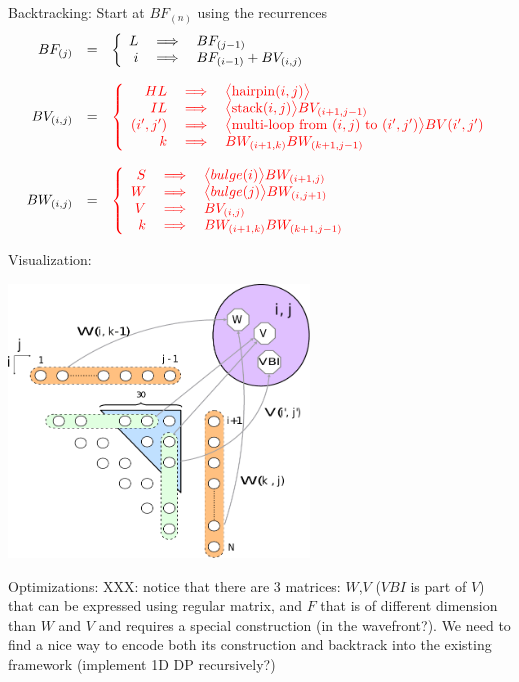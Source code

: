 \item Backtracking: Start at $BF_{(n)}$ using the recurrences
 \[\begin{array}{rcl}
	BF_{(j)} &=& \left\{\begin{array}{rcl} L&\implies& BF_{(j-1)} \\ i &\implies& BF_{(i-1)} + BV_{(i,j)} \end{array} \right.\\
	\\
	BV_{(i,j)} &=& \color{red} \left\{\begin{array}{rcl}
		HL &\implies&\big< {\rm hairpin}(i,j) \big> \\
		IL &\implies& \big< {\rm stack}(i,j) \big> BV_{(i+1,j-1)} \\
		(i',j') &\implies& \big< \text{multi-loop from $(i,j)$ to }(i',j') \big> BV(i',j')\\
		k &\implies& BW_{(i+1,k)} BW_{(k+1,j-1)}
	\end{array}\right.\\
	\\
	BW_{(i,j)} &=& \color{red} \left\{\begin{array}{rcl}
	S & \implies & \big< bulge(i) \big> BW_{(i+1,j)} \\
	W & \implies & \big< bulge(j) \big> BW_{(i,j+1)} \\
	V &\implies& BV_{(i,j)} \\
	k &\implies& BW_{(i+1,k)} BW_{(k+1,j-1)}
	\end{array}\right.
\end{array}\]

\item Visualization: \begin{center}\includegraphics[width=8cm]{inc/zucker.pdf}\end{center}
\item Optimizations: {\color{red} XXX: notice that there are 3 matrices: $W$,$V$ ($VBI$ is part of $V$) that can be expressed using regular matrix, and $F$ that is of different dimension than $W$ and $V$ and requires a special construction (in the wavefront?). We need to find a nice way to encode both its construction and backtrack into the existing framework (implement 1D DP recursively?)}
\ole

